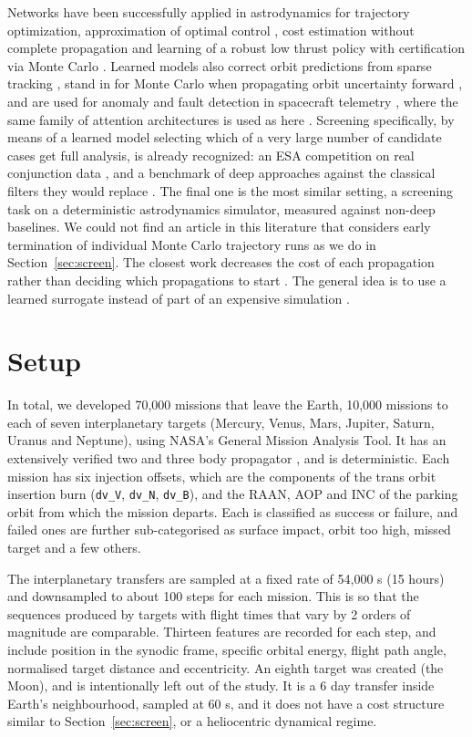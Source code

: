 \documentclass[preprint,12pt,authoryear]{elsarticle}
\begin{document}
Networks have been successfully applied in astrodynamics for trajectory optimization, approximation of optimal control \citep{izzo2019survey,izzo2024,sanchez2018}, cost estimation without complete propagation \citep{li2020deep,izzo2019ml} and learning of a robust low thrust policy with certification via Monte Carlo \citep{zavoli2021}. Learned models also correct orbit predictions from sparse tracking \citep{li2020orbit}, stand in for Monte Carlo when propagating orbit uncertainty forward \citep{zhou2024}, and are used for anomaly and fault detection in spacecraft telemetry \citep{ibrahim2019,naik2020}, where the same family of attention architectures is used as here \citep{jiang2023}. Screening specifically, by means of a learned model selecting which of a very large number of candidate cases get full analysis, is already recognized: an ESA competition on real conjunction data \citep{uriot2020,acciarini2021}, and a benchmark of deep approaches against the classical filters they would replace \citep{stevenson2023}. The final one is the most similar setting, a screening task on a deterministic astrodynamics simulator, measured against non-deep baselines. We could not find an article in this literature that considers early termination of individual Monte Carlo trajectory runs as we do in Section~\ref{sec:screen}. The closest work decreases the cost of each propagation rather than deciding which propagations to start \citep{massari2017,jia2022}. The general idea is to use a learned surrogate instead of part of an expensive simulation \citep{yin2022}.

\section{Setup}
\label{sec:setup}

In total, we developed 70,000 missions that leave the Earth, 10,000 missions to each of seven interplanetary targets (Mercury, Venus, Mars, Jupiter, Saturn, Uranus and Neptune), using NASA's General Mission Analysis Tool. It has an extensively verified two and three body propagator \citep{hughes2014}, and is deterministic. Each mission has six injection offsets, which are the components of the trans orbit insertion burn (\texttt{dv\_V}, \texttt{dv\_N}, \texttt{dv\_B}), and the RAAN, AOP and INC of the parking orbit from which the mission departs. Each is classified as success or failure, and failed ones are further sub-categorised as surface impact, orbit too high, missed target and a few others.

The interplanetary transfers are sampled at a fixed rate of 54,000 s (15 hours) and downsampled to about 100 steps for each mission. This is so that the sequences produced by targets with flight times that vary by 2 orders of magnitude are comparable. Thirteen features are recorded for each step, and include position in the synodic frame, specific orbital energy, flight path angle, normalised target distance and eccentricity. An eighth target was created (the Moon), and is intentionally left out of the study. It is a 6 day transfer inside Earth's neighbourhood, sampled at 60 s, and it does not have a cost structure similar to Section~\ref{sec:screen}, or a heliocentric dynamical regime.
\end{document}
